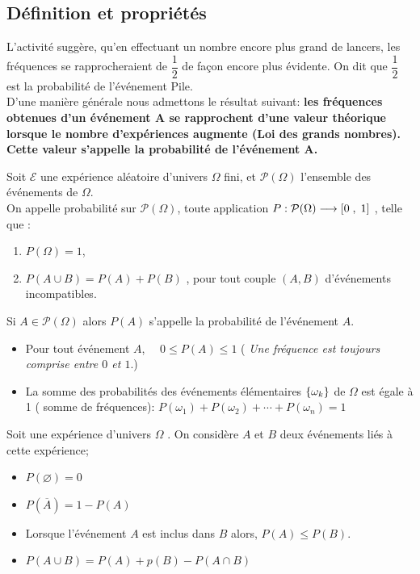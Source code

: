 \subsection*{Définition et propriétés}
L'activité suggère, qu'en effectuant un nombre encore plus grand de lancers, les fréquences se
rapprocheraient de \;$\dfrac{1}{2} $ \; de façon encore plus évidente. On dit que \; $\dfrac{1}{2} $ \; est la probabilité de l'événement Pile. \\
D'une manière générale  nous admettons le  résultat suivant: \textbf{les fréquences obtenues d’un événement A se rapprochent d’une valeur théorique lorsque le nombre d’expériences augmente (Loi des grands nombres). Cette valeur s’appelle la probabilité de l’événement A.}
\begin{definition}
Soit $ \mathcal{E} $ une expérience aléatoire d’univers $ \Omega $ fini,  et  $ \mathcal{P}(\Omega) $ l’ensemble des événements  de $ \Omega $.\\ On appelle probabilité sur $ \mathcal{P}(\Omega) $, toute application  $ P : \mathcal{P}(\Omega) \longrightarrow  \left[0\;,\; 1\right] $ , telle que :
\begin{enumerate}
\item $  P(\Omega)=1 $,
\item $ P(A\cup B)=P(A)+ P(B) $ , pour tout couple $(A, B)$  d’événements incompatibles.
\end{enumerate}
 

Si $ A\in  \mathcal{P}(\Omega) $  alors  $ P(A) $ s'appelle la probabilité de l'événement $ A. $
\end{definition}
\begin{remark}
\begin{itemize}
\item Pour tout événement  $ A $, $\quad 0\leq  P(A) \leq 1 $\; ( \textit{Une fréquence est toujours comprise entre \; $0 $ et $ 1.$})
\item La somme des probabilités  des événements élémentaires $ \left\{\omega_{k}\right\} $ de $ \Omega $  est égale à 1   ( somme  de fréquences): $ P(\omega _{1}) +P(\omega _{2})+\cdots + P(\omega_{n}) =1 $
\end{itemize}
\end{remark}
\begin{property} 
Soit une expérience d’univers $ \Omega $ . On considère  $A$ et $ B$ deux événements liés à cette expérience;
\begin{itemize}
\item $ P(\varnothing)=0 $
\item $ P(\overline{A} )=1-P(A)$
\item Lorsque l’événement  $A$ est inclus dans $B$ alors,  $P(A) \leq P(B)$.
\item $ P(A\cup B)= P(A)+ p(B)- P(A \cap B) $
\end{itemize}
\end{property}

